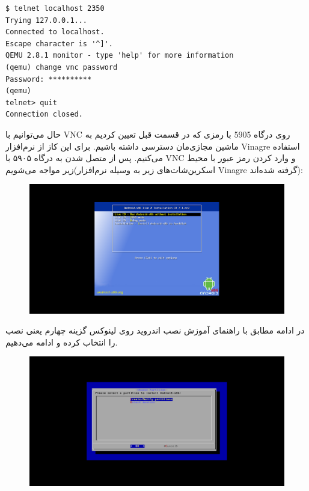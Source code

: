 \documentclass{article}
\begin{document}
\begin{latin}
\begin{verbatim}
$ telnet localhost 2350
Trying 127.0.0.1...
Connected to localhost.
Escape character is '^]'.
QEMU 2.8.1 monitor - type 'help' for more information
(qemu) change vnc password
Password: **********
(qemu) 
telnet> quit
Connection closed.	
\end{verbatim}
\end{latin}

حال می‌توانیم با VNC روی درگاه 5905 با رمزی که در قسمت قبل تعیین کردیم به ماشین مجازی‌مان دسترسی داشته باشیم. برای این کاز از نرم‌افزار Vinagre استفاده می‌کنیم. پس از متصل شدن به درگاه ۵۹۰۵ با VNC و وارد کردن رمز عبور با محیط زیر مواجه می‌شویم(اسکرین‌شات‌های زیر به وسیله نرم‌افزار Vinagre گرفته شده‌اند):

\begin{figure}[ht]
	\centering	
	\includegraphics[width = 1\textwidth]{images/install1.png}
\end{figure}

در ادامه مطابق با راهنمای آموزش نصب اندروید روی لینوکس\cite{6} گزینه چهارم یعنی نصب را انتخاب کرده و ادامه می‌دهیم.

\begin{figure}[ht]
	\centering	
	\includegraphics[width = 1\textwidth]{images/install2.png}
\end{figure}
\end{document}
